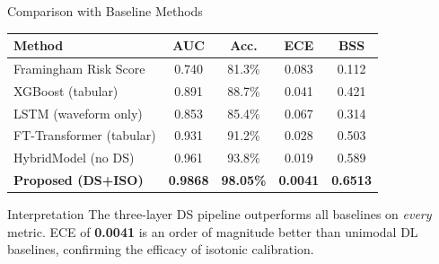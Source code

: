 \documentclass[aspectratio=169]{beamer}
\begin{document}
\begin{frame}{Comparison with Baseline Methods}
  \begin{center}\small
  \begin{tabular}{@{}p{4.2cm}cccc@{}}
    \toprule
    \textbf{Method} & \textbf{AUC} & \textbf{Acc.} & \textbf{ECE} & \textbf{BSS} \\
    \midrule
    Framingham Risk Score      & 0.740 & 81.3\% & 0.083 & 0.112 \\
    XGBoost (tabular)          & 0.891 & 88.7\% & 0.041 & 0.421 \\
    LSTM (waveform only)       & 0.853 & 85.4\% & 0.067 & 0.314 \\
    FT-Transformer (tabular)   & 0.931 & 91.2\% & 0.028 & 0.503 \\
    HybridModel (no DS)        & 0.961 & 93.8\% & 0.019 & 0.589 \\
    \textbf{Proposed (DS+ISO)} & \textbf{0.9868} & \textbf{98.05\%}
                               & \textbf{0.0041} & \textbf{0.6513} \\
    \bottomrule
  \end{tabular}
  \end{center}
  \begin{block}{Interpretation}
    The three-layer DS pipeline outperforms all baselines on \emph{every} metric.
    ECE of \textbf{0.0041} is an order of magnitude better than unimodal DL
    baselines, confirming the efficacy of isotonic calibration.
  \end{block}
\end{frame}
\end{document}
